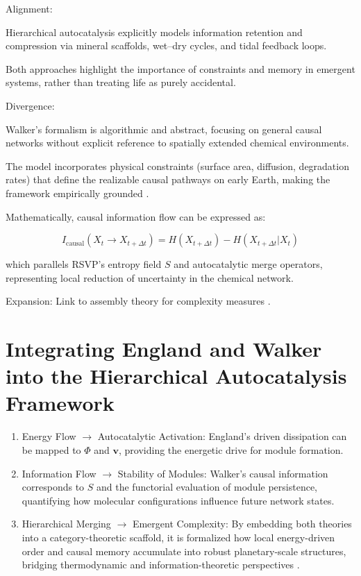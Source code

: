 \documentclass[openany]{book}
\begin{document}
Alignment:

Hierarchical autocatalysis explicitly models information retention and compression via mineral scaffolds, wet–dry cycles, and tidal feedback loops.

Both approaches highlight the importance of constraints and memory in emergent systems, rather than treating life as purely accidental.

Divergence:

Walker’s formalism is algorithmic and abstract, focusing on general causal networks without explicit reference to spatially extended chemical environments.

The model incorporates physical constraints (surface area, diffusion, degradation rates) that define the realizable causal pathways on early Earth, making the framework empirically grounded \citep{walker2017}.

Mathematically, causal information flow can be expressed as:

\[I_\text{causal}(X_{t} \to X_{t+\Delta t}) = H(X_{t+\Delta t}) - H(X_{t+\Delta t} | X_t)\]

which parallels RSVP’s entropy field $S$ and autocatalytic merge operators, representing local reduction of uncertainty in the chemical network.

Expansion: Link to assembly theory for complexity measures \citep{sharma2023}.

\section{Integrating England and Walker into the Hierarchical Autocatalysis Framework}
\begin{enumerate}
\item Energy Flow $\to$ Autocatalytic Activation: England’s driven dissipation can be mapped to $\Phi$ and $\mathbf{v}$, providing the energetic drive for module formation.
\item Information Flow $\to$ Stability of Modules: Walker’s causal information corresponds to $S$ and the functorial evaluation of module persistence, quantifying how molecular configurations influence future network states.
\item Hierarchical Merging $\to$ Emergent Complexity: By embedding both theories into a category-theoretic scaffold, it is formalized how local energy-driven order and causal memory accumulate into robust planetary-scale structures, bridging thermodynamic and information-theoretic perspectives \citep{hordijk2013}.
\end{enumerate}
\end{document}
